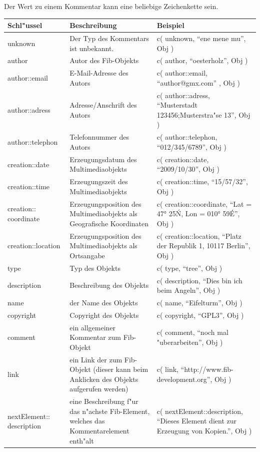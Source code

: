 Der Wert zu einem Kommentar kann eine beliebige Zeichenkette sein.

\begin{center}
\begin{longtable}{|p{20mm}|p{55mm}|p{50mm}|}\hline
	\textbf{Schl"ussel} & \textbf{Beschreibung} & \textbf{Beispiel} \\\hline\endhead
	unknown & Der Typ des Kommentars ist unbekannt. & c( unknown, ``ene mene mu'', Obj )\\\hline
	author & Autor des Fib-Objekts & c( author, ``oesterholz'', Obj )\\\hline
	author::email & E-Mail-Adresse des Autors & c( author::email, ``author@gmx.com'' , Obj )\\\hline
	author::adress & Adresse/Anschrift des Autors & c( author::adress, ``Musterstadt 123456;Musterstra"se 13'', Obj )\\\hline
	author::tele\-phon & Telefonnummer des Autors & c( author::telephon, ``012/345/6789'', Obj )\\\hline
	creation::date & Erzeugungsdatum des Multimediaobjekts & c( creation::date, ``2009/10/30'', Obj )\\\hline
	creation::time & Erzeugungszeit des Multimediaobjekts & c( creation::time, ``15/57/32'', Obj )\\\hline
	creation:: coordinate & Erzeugungsposition des Multimediaobjekts als Geografische Koordinaten & c( creation::coordinate, ``Lat = 47° 25\' N, Lon = 010° 59\' E'', Obj )\\\hline
	creation::\-lo\-ca\-tion & Erzeugungsposition des Multimediaobjekts als Ortsangabe & c( creation::location, ``Platz der Republik 1, 10117 Berlin'', Obj )\\\hline
	type & Typ des Objekts & c( type, ``tree'', Obj )\\\hline
	description & Beschreibung des Objekts & c( description, ``Dies bin ich beim Angeln'', Obj )\\\hline
	name & der Name des Objekts & c( name, ``Eifelturm'', Obj )\\\hline
	copyright & Copyright des Objekts & c( copyright, ``GPL3'', Obj )\\\hline
	comment & ein allgemeiner Kommentar zum Fib-Objekt & c( comment, ``noch mal "uberarbeiten'', Obj )\\\hline
	link & ein Link der zum Fib-Objekt (dieser kann beim Anklicken des Objekts aufgerufen werden) & c( link, ``http://www.fib-development.org'', Obj )\\\hline
	nextElement:: description & eine Beschreibung f"ur das n"achste Fib-Element, welches das Kommentarelement enth"alt & c( nextElement::description, ``Dieses Element dient zur Erzeugung von Kopien.'', Obj )\\\hline

\end{longtable}
\end{center}
